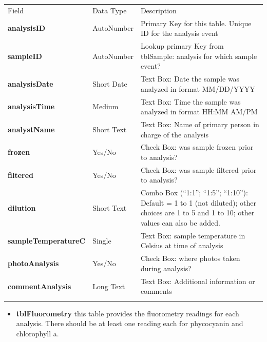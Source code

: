 \documentclass[]{article}
\begin{document}
\begin{longtable}[c]{@{}lll@{}}
\toprule\addlinespace
Field & Data Type & Description
\\\addlinespace
\midrule\endhead
\textbf{analysisID} & AutoNumber & Primary Key for this table. Unique ID
for the analysis event
\\\addlinespace
\textbf{sampleID} & AutoNumber & Lookup primary Key from tblSample:
analysis for which sample event?
\\\addlinespace
\textbf{analysisDate} & Short Date & Text Box: Date the sample was
analyzed in format MM/DD/YYYY
\\\addlinespace
\textbf{analysisTime} & Medium & Text Box: Time the sample was analyzed
in format HH:MM AM/PM
\\\addlinespace
\textbf{analystName} & Short Text & Text Box: Name of primary person in
charge of the analysis
\\\addlinespace
\textbf{frozen} & Yes/No & Check Box: was sample frozen prior to
analysis?
\\\addlinespace
\textbf{filtered} & Yes/No & Check Box: was sample filtered prior to
analysis?
\\\addlinespace
\textbf{dilution} & Short Text & Combo Box (``1:1''; ``1:5''; ``1:10''):
Default = 1 to 1 (not diluted); other choices are 1 to 5 and 1 to 10;
other values can also be added.
\\\addlinespace
\textbf{sampleTemperatureC} & Single & Text Box: sample temperature in
Celsius at time of analysis
\\\addlinespace
\textbf{photoAnalysis} & Yes/No & Check Box: where photos taken during
analysis?
\\\addlinespace
\textbf{commentAnalysis} & Long Text & Text Box: Additional information
or comments
\\\addlinespace
\bottomrule
\end{longtable}

\begin{itemize}
\itemsep1pt\parskip0pt
\item
  \textbf{tblFluorometry} this table provides the fluorometry readings
  for each analysis. There should be at least one reading each for
  phycocyanin and chlorophyll a.
\end{itemize}
\end{document}
